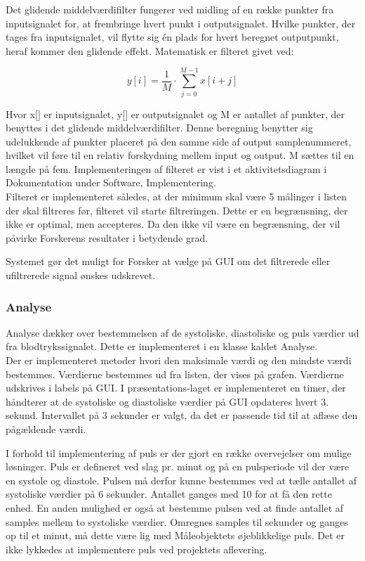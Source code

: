 Det glidende middelværdifilter fungerer ved midling af en række punkter fra inputsignalet for, at frembringe hvert punkt i outputsignalet. Hvilke punkter, der tages fra inputsignalet, vil flytte sig én plads for hvert beregnet outputpunkt, heraf kommer den glidende effekt. Matematisk er filteret givet ved:
\begin{ceqn}
\begin{equation}
y[i]=\frac{1}{M}\cdot\sum\limits_{j=0}^{M-1} x[i+j]
\end{equation}
\end{ceqn}
Hvor x[] er inputsignalet, y[] er outputsignalet og M er antallet af punkter, der benyttes i det glidende middelværdifilter. Denne beregning benytter sig udelukkende af punkter placeret på den samme side af output samplenummeret, hvilket vil føre til en relativ forskydning mellem input og output. M sættes til en længde på fem. Implementeringen af filteret er vist i et aktivitetsdiagram i Dokumentation under Software, Implementering.\\
Filteret er implementeret således, at der minimum skal være 5 målinger i listen der skal filtreres før, filteret vil starte filtreringen. Dette er en begrænsning, der ikke er optimal, men accepteres. Da den ikke vil være en begrænsning, der vil påvirke Forskerens resultater i betydende grad. 

Systemet gør det muligt for Forsker at vælge på GUI om det filtrerede eller ufiltrerede signal ønskes udskrevet. 

\subsubsection{Analyse}
Analyse dækker over bestemmelsen af de systoliske, diastoliske og puls værdier ud fra blodtrykssignalet. Dette er implementeret i en klasse kaldet Analyse. \\
Der er implementeret metoder hvori den maksimale værdi og den mindste værdi bestemmes. Værdierne bestemmes ud fra listen, der vises på grafen. Værdierne udskrives i labels på GUI. I præsentations-laget er implementeret en timer\cite{Timer}, der håndterer at de systoliske og diastoliske værdier på GUI opdateres hvert 3. sekund. Intervallet på 3 sekunder er valgt, da det er passende tid til at aflæse den pågældende værdi.

I forhold til implementering af puls er der gjort en række overvejelser om mulige løsninger. Puls er defineret ved slag pr. minut og på en pulsperiode vil der være en systole og diastole. Pulsen må derfor kunne bestemmes ved at tælle antallet af systoliske værdier på 6 sekunder. Antallet ganges med 10 for at få den rette enhed. En anden mulighed er også at bestemme pulsen ved at finde antallet af samples mellem to systoliske værdier. Omregnes samples til sekunder og ganges op til et minut, må dette være lig med Måleobjektets øjeblikkelige puls. Det er ikke lykkedes at implementere puls ved projektets aflevering.

